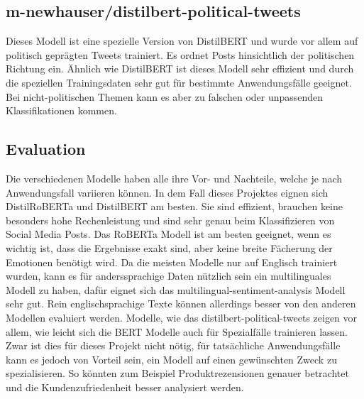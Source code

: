 \subsection{m-newhauser/distilbert-political-tweets}
Dieses Modell ist eine spezielle Version von DistilBERT und wurde vor allem auf politisch geprägten Tweets trainiert. Es ordnet Posts hinsichtlich der politischen Richtung ein. Ähnlich wie DistilBERT ist dieses Modell sehr effizient und durch die speziellen Trainingsdaten sehr gut für bestimmte Anwendungsfälle geeignet. Bei nicht-politischen Themen kann es aber zu falschen oder unpassenden Klassifikationen kommen.

\subsection{Evaluation}
Die verschiedenen Modelle haben alle ihre Vor- und Nachteile, welche je nach Anwendungsfall variieren können. In dem Fall dieses Projektes eignen sich DistilRoBERTa und DistilBERT am besten. Sie sind effizient, brauchen keine besonders hohe Rechenleistung und sind sehr genau beim Klassifizieren von Social Media Posts. Das RoBERTa Modell ist am besten geeignet, wenn es wichtig ist, dass die Ergebnisse exakt sind, aber keine breite Fächerung der Emotionen benötigt wird. Da die meisten Modelle nur auf Englisch trainiert wurden, kann es für anderssprachige Daten nützlich sein ein multilinguales Modell zu haben, dafür eignet sich das multilingual-sentiment-analysis Modell sehr gut. Rein englischsprachige Texte können allerdings besser von den anderen Modellen evaluiert werden. Modelle, wie das distilbert-political-tweets zeigen vor allem, wie leicht sich die BERT Modelle auch für Spezialfälle trainieren lassen. Zwar ist dies für dieses Projekt nicht nötig, für tatsächliche Anwendungsfälle kann es jedoch von Vorteil sein, ein Modell auf einen gewünschten Zweck zu spezialisieren. So könnten zum Beispiel Produktrezensionen genauer betrachtet und die Kundenzufriedenheit besser analysiert werden.